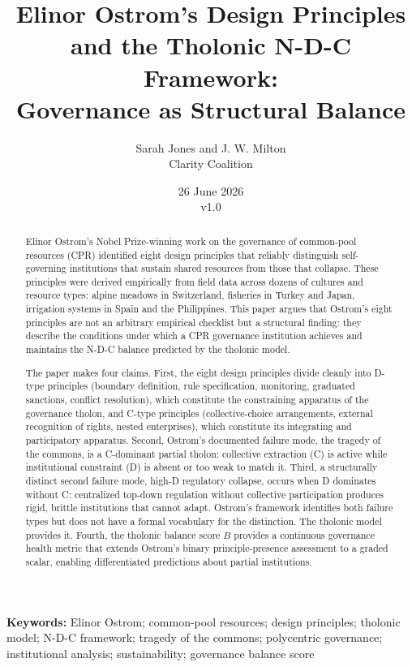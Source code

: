 \documentclass[12pt]{article}
\title{Elinor Ostrom's Design Principles and the Tholonic N-D-C Framework:\\
\large Governance as Structural Balance}
\author{Sarah Jones and J. W. Milton\\[4pt]{\small Clarity Coalition}}
\date{\small 26 June 2026 \\ v1.0}
\begin{document}
\maketitle

\noindent\textbf{Keywords:} Elinor Ostrom; common-pool resources; design principles; tholonic model; N-D-C framework; tragedy of the commons; polycentric governance; institutional analysis; sustainability; governance balance score

\begin{abstract}
Elinor Ostrom's Nobel Prize-winning work on the governance of
common-pool resources (CPR) identified eight design principles that
reliably distinguish self-governing institutions that sustain shared
resources from those that collapse. These principles were derived
empirically from field data across dozens of cultures and resource
types: alpine meadows in Switzerland, fisheries in Turkey and Japan,
irrigation systems in Spain and the Philippines. This paper argues that
Ostrom's eight principles are not an arbitrary empirical checklist but a
structural finding: they describe the conditions under which a CPR
governance institution achieves and maintains the N-D-C balance
predicted by the tholonic model.

The paper makes four claims. First, the eight design principles divide
cleanly into D-type principles (boundary definition, rule specification,
monitoring, graduated sanctions, conflict resolution), which constitute
the constraining apparatus of the governance tholon, and C-type
principles (collective-choice arrangements, external recognition of
rights, nested enterprises), which constitute its integrating and
participatory apparatus. Second, Ostrom's documented failure mode, the
tragedy of the commons, is a C-dominant partial tholon: collective
extraction (C) is active while institutional constraint (D) is absent or
too weak to match it. Third, a structurally distinct second failure
mode, high-D regulatory collapse, occurs when D dominates without C:
centralized top-down regulation without collective participation
produces rigid, brittle institutions that cannot adapt. Ostrom's
framework identifies both failure types but does not have a formal
vocabulary for the distinction. The tholonic model provides it. Fourth,
the tholonic balance score \(B\) provides a continuous governance health
metric that extends Ostrom's binary principle-presence assessment to a
graded scalar, enabling differentiated predictions about partial
institutions.


\end{abstract}
\end{document}
